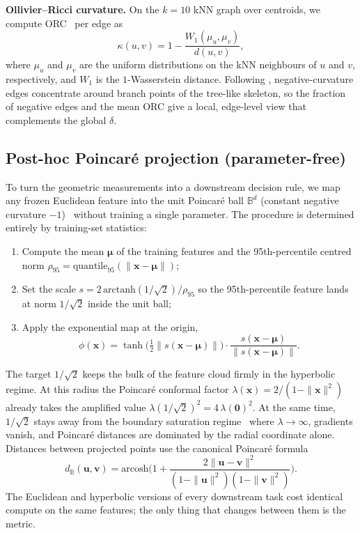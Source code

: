 \documentclass{article}
\begin{document}
\textbf{Ollivier--Ricci curvature.} On the $k{=}10$ kNN graph over centroids, we compute ORC~\citep{ollivier2009ricci} per edge as
\begin{equation}
\kappa(u,v) = 1 - \frac{W_1(\mu_u, \mu_v)}{d(u, v)},
\end{equation}
where $\mu_u$ and $\mu_v$ are the uniform distributions on the kNN neighbours of $u$ and $v$, respectively, and $W_1$ is the $1$-Wasserstein distance. Following \citet{ollivier2009ricci}, negative-curvature edges concentrate around branch points of the tree-like skeleton, so the fraction of negative edges and the mean ORC give a local, edge-level view that complements the global $\delta$.

\subsection{Post-hoc Poincar\'{e} projection (parameter-free)}
\label{sec:projection}

To turn the geometric measurements into a downstream decision rule, we map any frozen Euclidean feature into the unit Poincar\'{e} ball $\mathbb{B}^d$ (constant negative curvature $-1$)~\citep{nickel2017poincare, ganea2018hyperbolic} without training a single parameter. The procedure is determined entirely by training-set statistics:
\begin{enumerate}[topsep=0pt,itemsep=1pt,leftmargin=*]
\item Compute the mean $\boldsymbol\mu$ of the training features and the 95th-percentile centred norm $\rho_{95} = \mathrm{quantile}_{95}(\|\boldsymbol{x} - \boldsymbol\mu\|)$;
\item Set the scale $s = 2\,\mathrm{arctanh}(1/\sqrt{2})/\rho_{95}$ so the 95th-percentile feature lands at norm $1/\sqrt{2}$ inside the unit ball;
\item Apply the exponential map at the origin,
\begin{equation}
\phi(\boldsymbol{x}) = \tanh\!\Big(\tfrac{1}{2}\|s(\boldsymbol{x}-\boldsymbol\mu)\|\Big) \cdot \frac{s(\boldsymbol{x}-\boldsymbol\mu)}{\|s(\boldsymbol{x}-\boldsymbol\mu)\|}.
\end{equation}
\end{enumerate}
The target $1/\sqrt{2}$ keeps the bulk of the feature cloud firmly in the hyperbolic regime. At this radius the Poincar\'{e} conformal factor $\lambda(\boldsymbol{x}) = 2/(1-\|\boldsymbol{x}\|^2)$ already takes the amplified value $\lambda(1/\sqrt{2})^2 = 4\,\lambda(\mathbf{0})^2$. At the same time, $1/\sqrt{2}$ stays away from the boundary saturation regime~\citep{guo2022clipped} where $\lambda \to \infty$, gradients vanish, and Poincar\'{e} distances are dominated by the radial coordinate alone. Distances between projected points use the canonical Poincar\'{e} formula
\begin{equation}
d_\mathbb{B}(\boldsymbol{u},\boldsymbol{v}) = \mathrm{arcosh}\Big(1 + \frac{2\|\boldsymbol{u}-\boldsymbol{v}\|^2}{(1-\|\boldsymbol{u}\|^2)(1-\|\boldsymbol{v}\|^2)}\Big).
\end{equation}
The Euclidean and hyperbolic versions of every downstream task cost identical compute on the same features; the only thing that changes between them is the metric.
\end{document}
